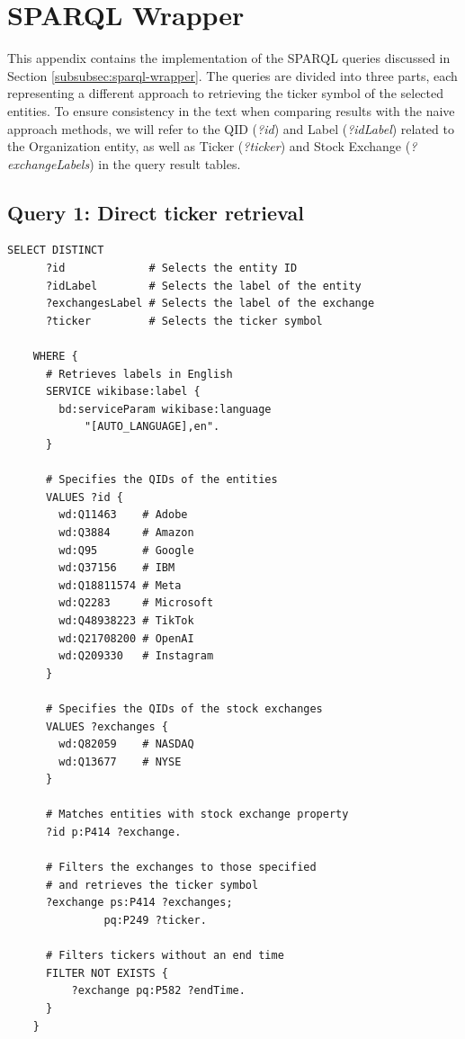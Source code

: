 \chapter{SPARQL Wrapper}
\label{app:sparql-wrapper}
This appendix contains the implementation of the SPARQL queries discussed in Section \ref{subsubsec:sparql-wrapper}. The queries are divided into three parts, each representing a different approach to retrieving the ticker symbol of the selected entities. To ensure consistency in the text when comparing results with the naive approach methods, we will refer to the QID (\textit{?id}) and Label (\textit{?idLabel}) related to the Organization entity, as well as Ticker (\textit{?ticker}) and Stock Exchange (\textit{?exchangeLabels}) in the query result tables.

\section{Query 1: Direct ticker retrieval}
\label{appsec:q1-direct-ticker-retrieval}

\begin{lstlisting}[language=SPARQL, caption={SPARQL Query 1: Retrieve entity information for entities directly with the \textit{stock exchange} property.}, label={lst:sparql_query_1}]
    SELECT DISTINCT 
      ?id             # Selects the entity ID
      ?idLabel        # Selects the label of the entity
      ?exchangesLabel # Selects the label of the exchange
      ?ticker         # Selects the ticker symbol
    
    WHERE {
      # Retrieves labels in English
      SERVICE wikibase:label {
        bd:serviceParam wikibase:language 
            "[AUTO_LANGUAGE],en".
      }
    
      # Specifies the QIDs of the entities
      VALUES ?id { 
        wd:Q11463    # Adobe
        wd:Q3884     # Amazon
        wd:Q95       # Google
        wd:Q37156    # IBM
        wd:Q18811574 # Meta
        wd:Q2283     # Microsoft
        wd:Q48938223 # TikTok
        wd:Q21708200 # OpenAI
        wd:Q209330   # Instagram
      }
    
      # Specifies the QIDs of the stock exchanges
      VALUES ?exchanges { 
        wd:Q82059    # NASDAQ
        wd:Q13677    # NYSE
      }
    
      # Matches entities with stock exchange property
      ?id p:P414 ?exchange.
    
      # Filters the exchanges to those specified 
      # and retrieves the ticker symbol
      ?exchange ps:P414 ?exchanges; 
               pq:P249 ?ticker.

      # Filters tickers without an end time
      FILTER NOT EXISTS {
          ?exchange pq:P582 ?endTime.
      }
    }
\end{lstlisting}

